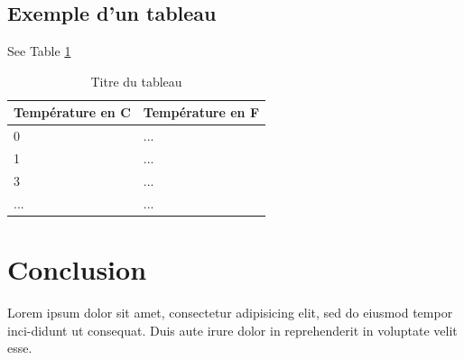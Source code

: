 \subsection{Exemple d'un tableau}

See Table \ref{tab:tableau1}

\begin{table}[h!]
\begin{center}
\caption{\label{tab:tableau1}Titre du tableau}
	\begin{tabular}{|l|l|}
		\hline
		\textbf{Température en C} & \textbf{Température en F} \\
		\hline
		\hline
		0 & ... \\
		\hline
		1 & ... \\
		\hline
		3 & ... \\
		\hline
		... & ... \\
		\hline
	\end{tabular}
\end{center}
\end{table}
\section{Conclusion}
Lorem ipsum dolor sit amet, consectetur adipisicing elit, sed do eiusmod tempor inci-didunt ut consequat. Duis aute irure dolor in reprehenderit in voluptate velit esse.